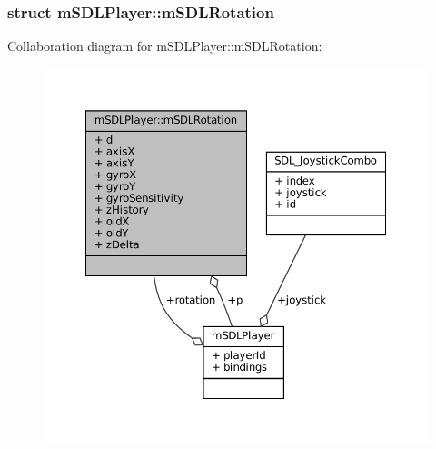 \label{structm_s_d_l_player_1_1m_s_d_l_rotation}
\subsubsection{struct m\+S\+D\+L\+Player\+:\+:m\+S\+D\+L\+Rotation}


Collaboration diagram for m\+S\+D\+L\+Player\+:\+:m\+S\+D\+L\+Rotation\+:
\nopagebreak
\begin{figure}[H]
\begin{center}
\leavevmode
\includegraphics[width=350pt]{structm_s_d_l_player_1_1m_s_d_l_rotation__coll__graph}
\end{center}
\end{figure}
